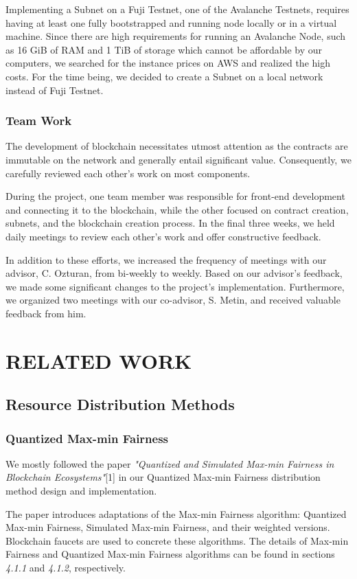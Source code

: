 \documentclass[a4paper,12pt]{report}
\begin{document}
Implementing a Subnet on a Fuji Testnet, one of the Avalanche Testnets, requires having at least one fully bootstrapped and running node locally or in a virtual machine. Since there are high requirements for running an Avalanche Node, such as 16 GiB of RAM and 1 TiB of storage which cannot be affordable by our computers, we searched for the instance prices on AWS and realized the high costs. For the time being, we decided to create a Subnet on a local network instead of Fuji Testnet.

\subsection{Team Work}
The development of blockchain necessitates utmost attention as the contracts are immutable on the network and generally entail significant value. Consequently, we carefully reviewed each other's work on most components.

During the project, one team member was responsible for front-end development and connecting it to the blockchain, while the other focused on contract creation, subnets, and the blockchain creation process. In the final three weeks, we held daily meetings to review each other's work and offer constructive feedback.

In addition to these efforts, we increased the frequency of meetings with our advisor, C. Ozturan, from bi-weekly to weekly. Based on our advisor's feedback, we made some significant changes to the project's implementation. Furthermore, we organized two meetings with our co-advisor, S. Metin, and received valuable feedback from him.

\chapter{RELATED WORK}
\section{Resource Distribution Methods}
\subsection{Quantized Max-min Fairness}
We mostly followed the paper \textit{"Quantized and Simulated Max-min Fairness in Blockchain Ecosystems"}[1] in our Quantized Max-min Fairness distribution method design and implementation. 

The paper introduces adaptations of the Max-min Fairness algorithm: Quantized Max-min Fairness, Simulated Max-min Fairness, and their weighted versions. Blockchain faucets are used to concrete these algorithms. The details of Max-min Fairness and Quantized Max-min Fairness algorithms can be found in sections \textit{4.1.1} and \textit{4.1.2}, respectively.
\end{document}
